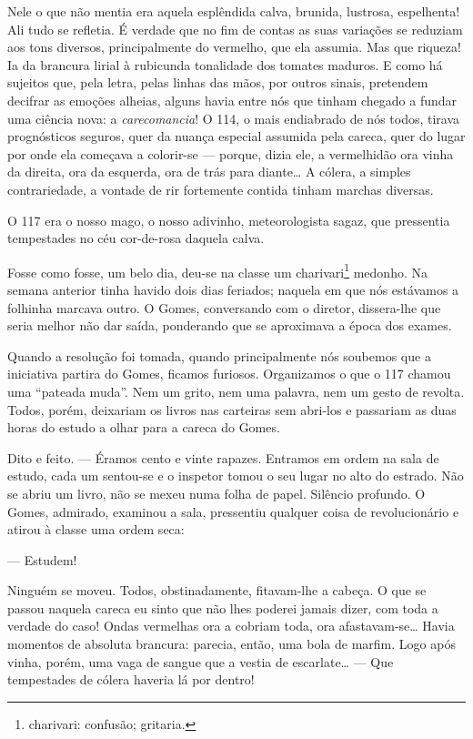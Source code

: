 Nele o que não mentia era aquela esplêndida calva, brunida, lustrosa,
espelhenta! Ali tudo se refletia. É verdade que no fim de contas as suas
variações se reduziam aos tons diversos, principalmente do vermelho, que
ela assumia. Mas que riqueza! Ia da brancura lirial à rubicunda
tonalidade dos tomates maduros. E como há sujeitos que, pela letra,
pelas linhas das mãos, por outros sinais, pretendem decifrar as emoções
alheias, alguns havia entre nós que tinham chegado a fundar uma ciência
nova: a \emph{carecomancia}! O 114, o mais endiabrado de nós todos,
tirava prognósticos seguros, quer da nuança especial assumida pela
careca, quer do lugar por onde ela começava a colorir-se --- porque,
dizia ele, a vermelhidão ora vinha da direita, ora da esquerda, ora de
trás para diante\ldots{} A cólera, a simples contrariedade, a vontade de rir
fortemente contida tinham marchas diversas.

O 117 era o nosso mago, o nosso adivinho, meteorologista sagaz, que
pressentia tempestades no céu cor-de-rosa daquela calva.

Fosse como fosse, um belo dia, deu-se na classe um charivari\footnote{charivari:
  confusão; gritaria.} medonho. Na semana anterior tinha havido dois
dias feriados; naquela em que nós estávamos a folhinha marcava outro. O
Gomes, conversando com o diretor, dissera-lhe que seria melhor não dar
saída, ponderando que se aproximava a época dos exames.

Quando a resolução foi tomada, quando principalmente nós soubemos que a
iniciativa partira do Gomes, ficamos furiosos. Organizamos o que o 117
chamou uma ``pateada muda''. Nem um grito, nem uma palavra, nem um gesto
de revolta. Todos, porém, deixariam os livros nas carteiras sem abri-los
e passariam as duas horas do estudo a olhar para a careca do Gomes.

Dito e feito. --- Éramos cento e vinte rapazes. Entramos em ordem na
sala de estudo, cada um sentou-se e o inspetor tomou o seu lugar no alto
do estrado. Não se abriu um livro, não se mexeu numa folha de papel.
Silêncio profundo. O Gomes, admirado, examinou a sala, pressentiu
qualquer coisa de revolucionário e atirou à classe uma ordem seca:

--- Estudem!

Ninguém se moveu. Todos, obstinadamente, fitavam-lhe a cabeça. O que se
passou naquela careca eu sinto que não lhes poderei jamais dizer, com
toda a verdade do caso! Ondas vermelhas ora a cobriam toda, ora
afastavam-se\ldots{} Havia momentos de absoluta brancura: parecia, então, uma
bola de marfim. Logo após vinha, porém, uma vaga de sangue que a vestia
de escarlate\ldots{} --- Que tempestades de cólera haveria lá por dentro!

